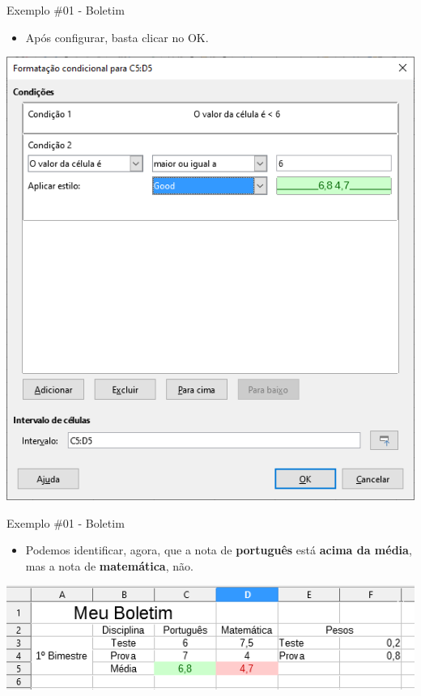 \begin{frame}{Exemplo \#01 - Boletim}
	\begin{block}{}
		\begin{itemize}
			\item Após configurar, basta clicar no OK.
		\end{itemize}
	\end{block}
	
	\centering
	\includegraphics[width=0.5\linewidth]{Figuras/Ch06/fig44.10}
\end{frame}


\begin{frame}{Exemplo \#01 - Boletim}
	\begin{block}{}
		\begin{itemize}
			\item Podemos identificar, agora, que a nota de \textbf{português} está \textbf{acima da média}, mas a nota de \textbf{matemática}, não.
		\end{itemize}
	\end{block}
	
	\bigskip
	
	\centering
	\includegraphics[width=1\linewidth]{Figuras/Ch06/fig44.11}
\end{frame}


